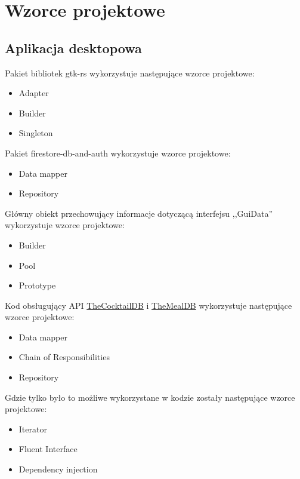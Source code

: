 \documentclass[12pt,a4paper]{article}
\begin{document}
	\section{Wzorce projektowe}
		\subsection{Aplikacja desktopowa}

			\indent Pakiet bibliotek gtk-rs wykorzystuje następujące wzorce projektowe:
			\begin{itemize}
				\item Adapter
				\item Builder
				\item Singleton								 
			\end{itemize}

			\indent Pakiet firestore-db-and-auth wykorzystuje wzorce projektowe:
			\begin{itemize}
				\item Data mapper
				\item Repository
			\end{itemize}
			Główny obiekt przechowujący informacje dotyczącą interfejsu ,,GuiData'' wykorzystuje wzorce projektowe:
			\begin{itemize}
				\item Builder
				\item Pool
				\item Prototype
			\end{itemize}

			\indent Kod obsługujący API \href{https://www.thecocktaildb.com/api.php}{TheCocktailDB} i \href{https://www.themealdb.com/api.php}{TheMealDB}
			wykorzystuje następujące wzorce projektowe:
			\begin{itemize}
				\item Data mapper
				\item Chain of Responsibilities
				\item Repository
			\end{itemize}

			\indent Gdzie tylko było to możliwe wykorzystane w kodzie zostały następujące wzorce projektowe:
			\begin{itemize}
			\item Iterator
			\item Fluent Interface
			\item Dependency injection
			\end{itemize}			 
\end{document}
